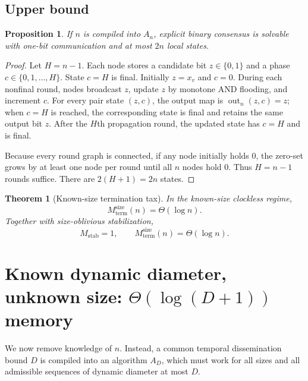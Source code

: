 \documentclass[11pt]{article}
\newtheorem{theorem}{Theorem}
\newtheorem{proposition}{Proposition}
\theoremstyle{remark}
\begin{document}
\subsection{Upper bound}
\begin{proposition}
If $n$ is compiled into $A_n$, explicit binary consensus is solvable with one-bit communication and at most $2n$ local states.
\end{proposition}
\begin{proof}
Let $H=n-1$. Each node stores a candidate bit $z\in\{0,1\}$ and a phase $c\in\{0,1,\ldots,H\}$. State $c=H$ is final. Initially $z=x_v$ and $c=0$. During each nonfinal round, nodes broadcast $z$, update $z$ by monotone AND flooding, and increment $c$. For every pair state $(z,c)$, the output map is $\operatorname{out}_n(z,c)=z$; when $c=H$ is reached, the corresponding state is final and retains the same output bit $z$. After the $H$th propagation round, the updated state has $c=H$ and is final.

Because every round graph is connected, if any node initially holds $0$, the zero-set grows by at least one node per round until all $n$ nodes hold $0$. Thus $H=n-1$ rounds suffice. There are $2(H+1)=2n$ states.
\end{proof}

\begin{theorem}[Known-size termination tax]
In the known-size clockless regime,
\[
\boxed{M_{\mathrm{term}}^{\mathrm{size}}(n)=\Theta(\log n).}
\]
Together with size-oblivious stabilization,
\[
\boxed{M_{\mathrm{stab}}=1,\qquad M_{\mathrm{term}}^{\mathrm{size}}(n)=\Theta(\log n).}
\]
\end{theorem}

\section{Known dynamic diameter, unknown size: \texorpdfstring{$\Theta(\log(D+1))$}{Theta(log(D+1))} memory}
We now remove knowledge of $n$. Instead, a common temporal dissemination bound $D$ is compiled into an algorithm $A_D$, which must work for all sizes and all admissible sequences of dynamic diameter at most $D$.
\end{document}
